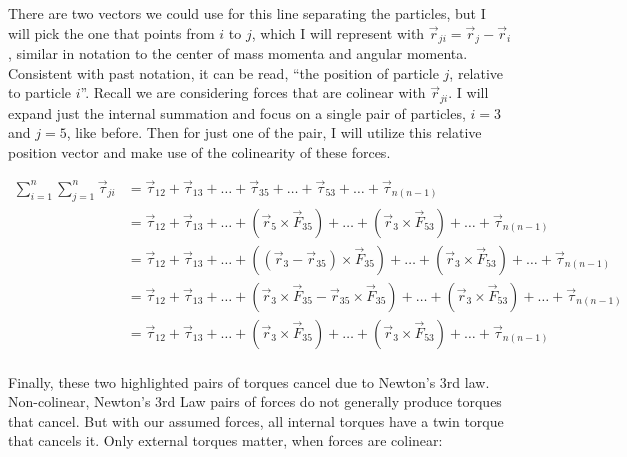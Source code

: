 \documentclass[10pt]{article}
\begin{document}
There are two vectors we could use for this line separating 
the particles, but 
I will pick the one that points from $i$ to $j$, which I will represent with 
$\vec{r}_{ji}=\vec{r}_j - \vec{r}_i$, similar in notation to 
the center of mass momenta and angular momenta. Consistent with 
past notation, it can be read, ``the position of particle $j$, relative to 
particle $i$''. Recall we are considering forces that are colinear with 
$\vec{r}_{ji}$. I will expand just the internal summation and focus on 
a single pair of particles, $i=3$ and $j=5$, like before. Then for 
just one of the pair, I will utilize this relative position vector and 
make use of the colinearity of these forces.

\begin{align*}
    \sum_{i=1}^n\sum_{j=1}^n\vec{\tau}_{ji} &=
        \vec{\tau}_{12}+\vec{\tau}_{13}+\ldots+\vec{\tau}_{35}+\ldots+
        \vec{\tau}_{53}+\ldots+\vec{\tau}_{n(n-1)} \\
    &=\vec{\tau}_{12}+\vec{\tau}_{13}+\ldots+
        \left(\vec{r}_5\times\vec{F}_{35}\right)
        +\ldots+
        \left(\vec{r}_3\times\vec{F}_{53}\right)
        +\ldots+\vec{\tau}_{n(n-1)} \\
    &=\vec{\tau}_{12}+\vec{\tau}_{13}+\ldots+
        \left((\vec{r}_3 - \vec{r}_{35})\times\vec{F}_{35}\right)
        +\ldots+
        \left(\vec{r}_3\times\vec{F}_{53}\right)
        +\ldots+\vec{\tau}_{n(n-1)} \\
    &=\vec{\tau}_{12}+\vec{\tau}_{13}+\ldots+
        \left(\vec{r}_3\times\vec{F}_{35} 
        - \vec{r}_{35}\times\vec{F}_{35}\right)
        +\ldots+
        \left(\vec{r}_3\times\vec{F}_{53}\right)
        +\ldots+\vec{\tau}_{n(n-1)} \\
    &=\vec{\tau}_{12}+\vec{\tau}_{13}+\ldots+
        \left(\vec{r}_3\times\vec{F}_{35}\right)
        +\ldots+
        \left(\vec{r}_3\times\vec{F}_{53}\right)
        +\ldots+\vec{\tau}_{n(n-1)} \\
\end{align*}

Finally, these two highlighted pairs of torques cancel due to 
Newton's 3rd law. Non-colinear, Newton's 3rd Law pairs of forces do not 
generally produce torques that cancel. But with our assumed forces, 
all internal torques have a twin torque that cancels it. Only 
external torques matter, when forces are colinear:
\begin{comment}
\begin{equation}
    \sum_{i=1}^n\dot{\vec{L}}_i = 
        \sum_{i=1}^n \dot{\vec{L}}_{i\,cm} = 
        \sum_{i=1}^n\sum_{j=n+1}^N\vec{\tau}_{ji} =
        \sum_{i=1}^n\sum_{j=n+1}^N\vec{\tau}_{ji\,cm} 
        = \vec{\tau}_{total,external} \label{n2mr}
\end{equation}
\end{comment}
\end{document}
